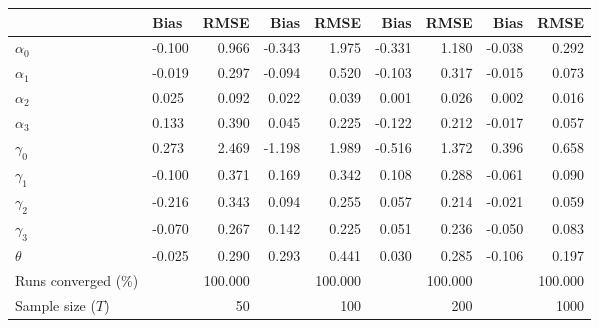 
\begin{tabular}[t]{llrrrrrrr}
\toprule
  & Bias & RMSE & Bias & RMSE & Bias & RMSE & Bias & RMSE\\
\midrule
$\alpha_{0}$ & -0.100 & 0.966 & -0.343 & 1.975 & -0.331 & 1.180 & -0.038 & 0.292\\
$\alpha_{1}$ & -0.019 & 0.297 & -0.094 & 0.520 & -0.103 & 0.317 & -0.015 & 0.073\\
$\alpha_{2}$ & 0.025 & 0.092 & 0.022 & 0.039 & 0.001 & 0.026 & 0.002 & 0.016\\
$\alpha_{3}$ & 0.133 & 0.390 & 0.045 & 0.225 & -0.122 & 0.212 & -0.017 & 0.057\\
$\gamma_{0}$ & 0.273 & 2.469 & -1.198 & 1.989 & -0.516 & 1.372 & 0.396 & 0.658\\
$\gamma_{1}$ & -0.100 & 0.371 & 0.169 & 0.342 & 0.108 & 0.288 & -0.061 & 0.090\\
$\gamma_{2}$ & -0.216 & 0.343 & 0.094 & 0.255 & 0.057 & 0.214 & -0.021 & 0.059\\
$\gamma_{3}$ & -0.070 & 0.267 & 0.142 & 0.225 & 0.051 & 0.236 & -0.050 & 0.083\\
$\theta$ & -0.025 & 0.290 & 0.293 & 0.441 & 0.030 & 0.285 & -0.106 & 0.197\\
Runs converged (\%) &  & 100.000 &  & 100.000 &  & 100.000 &  & 100.000\\
Sample size ($T$) &  & 50 &  & 100 &  & 200 &  & 1000\\
\bottomrule
\end{tabular}
